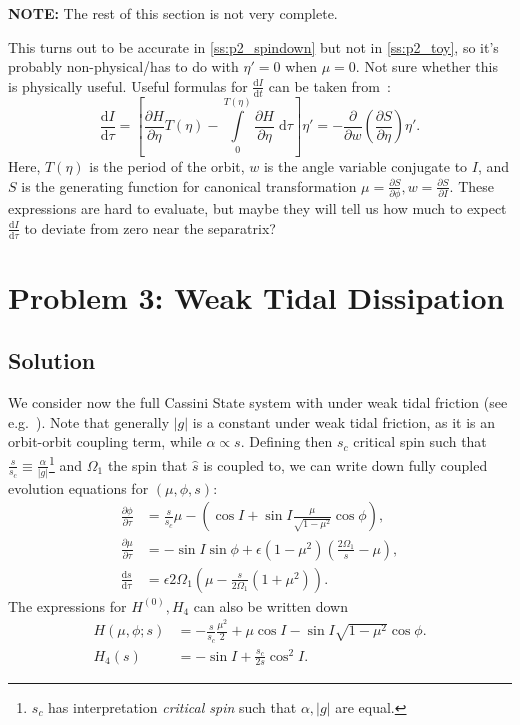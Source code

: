 \documentclass[
        fleqn,
        usenatbib,
    ]{mnras}
\newcommand*{\rd}[2]{\frac{\mathrm{d}#1}{\mathrm{d}#2}}
\newcommand*{\pd}[2]{\frac{\partial#1}{\partial#2}}
\newcommand*{\abs}[1]{\left|#1\right|}
\newcommand*{\p}[1]{\left(#1\right)}
\newcommand*{\s}[1]{\left[#1\right]}
\begin{document}
\textbf{NOTE:} The rest of this section is not very complete.

This turns out to be accurate in \autoref{ss:p2_spindown} but not in
\autoref{ss:p2_toy}, so it's probably non-physical/has to do with $\eta' = 0$
when $\mu = 0$. Not sure whether this is physically useful. Useful formulas for
$\rd{I}{t}$ can be taken from~\cite{henrard1982, l_and_l}:
\begin{equation}
    \rd{I}{\tau} = \s{\pd{H}{\eta}T(\eta) - \int\limits_0^{T(\eta)}
            \pd{H}{\eta}\;\mathrm{d}\tau} \eta'
        = -\pd{}{w}\p{\pd{S}{\eta}}\eta'.
\end{equation}
Here, $T(\eta)$ is the period of the orbit, $w$ is the angle variable conjugate
to $I$, and $S$ is the generating function for canonical transformation $\mu =
\pd{S}{\phi}, w = \pd{S}{I}$. These expressions are hard to evaluate, but maybe
they will tell us how much to expect $\rd{I}{\tau}$ to deviate from zero near
the separatrix?

\section{Problem 3: Weak Tidal Dissipation}\label{s:p3}

\subsection{Solution}

We consider now the full Cassini State system with under weak tidal friction
(see e.g.\ \cite{lai2012}). Note that generally $\abs{g}$ is a constant under
weak tidal friction, as it is an orbit-orbit coupling term, while $\alpha
\propto s$. Defining then $s_c$ critical spin such that $\frac{s}{s_c} \equiv
\frac{\alpha}{\abs{g}}$\footnote{$s_c$ has interpretation \emph{critical spin}
such that $\alpha, \abs{g}$ are equal.} and $\Omega_1$ the spin that $\hat{s}$
is coupled to, we can write down fully coupled evolution equations for $(\mu,
\phi, s)$:
\begin{subequations}\label{se:p3_eom}
    \begin{align}
        \pd{\phi}{\tau} &= \frac{s}{s_c}\mu
            - \p{\cos I + \sin I \frac{\mu}{\sqrt{1 - \mu^2}} \cos \phi},\\
        \pd{\mu}{\tau} &= -\sin I \sin \phi +
            \epsilon \p{1 - \mu^2} \p{\frac{2\Omega_1}{s} - \mu},\\
        \rd{s}{\tau}
            &= \epsilon 2\Omega_1 \p{\mu - \frac{s}{2\Omega_1}\p{1 + \mu^2}}.
    \end{align}
\end{subequations}
The expressions for $H^{(0)}, H_4$ can also be written down
\begin{align}
    H(\mu, \phi; s) &= -\frac{s}{s_c}\frac{\mu^2}{2}
        + \mu \cos I - \sin I \sqrt{1 - \mu^2}\cos \phi.\\
    H_4(s) &= -\sin I + \frac{s_c}{2s}\cos^2 I.
\end{align}
\end{document}
